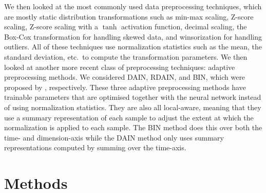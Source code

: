 \documentclass{statsmsc}
\begin{document}
{%
We then looked at the most commonly used data preprocessing techniques, which are mostly static
distribution transformations such as min-max scaling, Z-score scaling, Z-score scaling with a
$\tanh$ activation function, decimal scaling, the Box-Cox transformation for handling skewed data,
and winsorization for handling outliers. All of these techniques use normalization
statistics such as the
mean, the standard deviation, etc.\ to compute the transformation parameters. We then looked at
another more recent class of preprocessing techniques: adaptive preprocessing methods.
We considered \ac{DAIN}, \ac{RDAIN}, and \ac{BIN}, which were proposed by
\cite{dain,rdain,bin}, respectively. These three adaptive preprocessing
methods have trainable parameters that are optimised together with the neural
network instead of using normalization statistics. They are also all local-aware, meaning that they use
a summary representation of each sample to adjust the extent at which the normalization is applied
to each sample. The \ac{BIN} method does this over both the time- and dimension-axis while the
\ac{DAIN} method only uses summary representations computed by summing over the time-axis.


\chapter{Methods} %
\label{ch:Methods}

}
\end{document}
